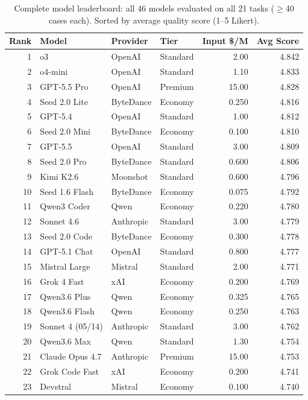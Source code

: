 \begin{table}[htbp]
\centering
\small
\caption{Complete model leaderboard: all 46 models evaluated on all 21 tasks ($\geq$40 cases each). Sorted by average quality score (1--5 Likert).}
\label{tab:model-leaderboard}
\begin{tabular}{rlllrr}
\toprule
\textbf{Rank} & \textbf{Model} & \textbf{Provider} & \textbf{Tier} & \textbf{Input \$/M} & \textbf{Avg Score} \\
\midrule
1 & o3 & OpenAI & Standard & 2.00 & 4.842 \\
2 & o4-mini & OpenAI & Standard & 1.10 & 4.833 \\
3 & GPT-5.5 Pro & OpenAI & Premium & 15.00 & 4.828 \\
4 & Seed 2.0 Lite & ByteDance & Economy & 0.250 & 4.816 \\
5 & GPT-5.4 & OpenAI & Standard & 1.00 & 4.812 \\
6 & Seed 2.0 Mini & ByteDance & Economy & 0.100 & 4.810 \\
7 & GPT-5.5 & OpenAI & Standard & 3.00 & 4.809 \\
8 & Seed 2.0 Pro & ByteDance & Standard & 0.600 & 4.806 \\
9 & Kimi K2.6 & Moonshot & Standard & 0.600 & 4.796 \\
10 & Seed 1.6 Flash & ByteDance & Economy & 0.075 & 4.792 \\
11 & Qwen3 Coder & Qwen & Economy & 0.220 & 4.780 \\
12 & Sonnet 4.6 & Anthropic & Standard & 3.00 & 4.779 \\
13 & Seed 2.0 Code & ByteDance & Economy & 0.300 & 4.778 \\
14 & GPT-5.1 Chat & OpenAI & Standard & 0.800 & 4.777 \\
15 & Mistral Large & Mistral & Standard & 2.00 & 4.771 \\
16 & Grok 4 Fast & xAI & Economy & 0.200 & 4.769 \\
17 & Qwen3.6 Plus & Qwen & Economy & 0.325 & 4.765 \\
18 & Qwen3.6 Flash & Qwen & Economy & 0.250 & 4.763 \\
19 & Sonnet 4 (05/14) & Anthropic & Standard & 3.00 & 4.762 \\
20 & Qwen3.6 Max & Qwen & Standard & 1.30 & 4.754 \\
21 & Claude Opus 4.7 & Anthropic & Premium & 15.00 & 4.753 \\
22 & Grok Code Fast & xAI & Economy & 0.200 & 4.741 \\
23 & Devstral & Mistral & Economy & 0.100 & 4.740 \\

\end{tabular}
\end{table}
